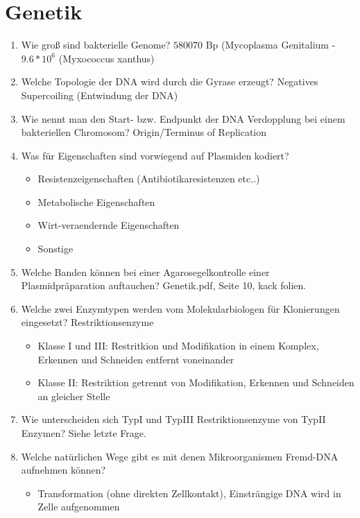 \section{Genetik}

\begin{enumerate}
		        \item Wie groß sind bakterielle Genome?
				$580070$ Bp (Mycoplasma Genitalium - $9.6 * 10^6$ (Myxococcus xanthus)
			\item Welche Topologie der DNA wird durch die Gyrase erzeugt?
				Negatives Supercoiling (Entwindung der DNA)
			\item Wie nennt man den Start- bzw. Endpunkt der DNA Verdopplung bei einem bakteriellen Chromosom?
				Origin/Terminus of Replication
			\item Was f\"ur Eigenschaften sind vorwiegend auf Plasmiden kodiert?
				\begin{itemize}
					\item Resistenzeigenschaften (Antibiotikaresistenzen etc..)
					\item Metabolische Eigenschaften 
					\item Wirt-veraendernde Eigenschaften 
					\item Sonstige 
				\end{itemize}
			\item Welche Banden k\"onnen bei einer Agarosegelkontrolle einer Plasmidpr\"aparation auftauchen?
				Genetik.pdf, Seite 10, kack folien.
			\item Welche zwei Enzymtypen werden vom Molekularbiologen f\"ur Klonierungen eingesetzt?
				Restriktionsenzyme
				\begin{itemize}
					\item Klasse I und III: Restritkion und Modifikation in einem Komplex, Erkennen und Schneiden entfernt voneinander
					\item Klasse II: Restriktion getrennt von Modifikation, Erkennen und Schneiden an gleicher Stelle
				\end{itemize}
			\item Wie unterscheiden sich TypI und TypIII Restriktionsenzyme von TypII Enzymen?
				Siehe letzte Frage.
			\item Welche nat\"urlichen Wege gibt es mit denen Mikroorganismen Fremd-DNA aufnehmen k\"onnen?
				\begin{itemize}
						\item Transformation (ohne direkten Zellkontakt), Einstr\"angige DNA wird in Zelle aufgenommen

\end{itemize}
\end{enumerate}
